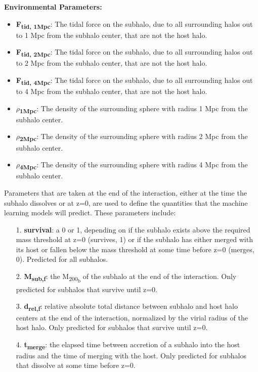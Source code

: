 \documentclass[fleqn,usenatbib]{mnras}
\begin{document}
\vskip 0.1in    
    \noindent\textbf{Environmental Parameters:}
    \begin{itemize}[leftmargin=.4cm,topsep=0pt]
        \item \textbf{F\textsubscript{tid, 1Mpc}}: The tidal force on the subhalo, due to all surrounding halos out to 1 Mpc from the subhalo center, that are not the host halo.
        \item \textbf{F\textsubscript{tid, 2Mpc}}: The tidal force on the subhalo, due to all surrounding halos out to 2 Mpc from the subhalo center, that are not the host halo.
        \item \textbf{F\textsubscript{tid, 4Mpc}}:
        The tidal force on the subhalo, due to all surrounding halos out to 4 Mpc from the subhalo center, that are not the host halo.
        \item \boldmath$\rho$\unboldmath\textbf{\textsubscript{1Mpc}}: The density of the surrounding sphere with radius 1 Mpc from the subhalo center.
        \item \boldmath$\rho$\unboldmath\textbf{\textsubscript{2Mpc}}: The density of the surrounding sphere with radius 2 Mpc from the subhalo center.
        \item \boldmath$\rho$\unboldmath\textbf{\textsubscript{4Mpc}}: The density of the surrounding sphere with radius 4 Mpc from the subhalo center.
    \end{itemize}
\vskip 0.1in  
Parameters that are taken at the end of the interaction, either at the time the subhalo dissolves or at z=0, are used to define the quantities that the machine learning models will predict. These parameters include:
    \begin{enumerate}[leftmargin=.4cm]
        \item [1.] \textbf{survival}: a 0 or 1, depending on if the subhalo exists above the required mass threshold at z=0 (survives, 1) or if the subhalo has either merged with its host or fallen below the mass threshold at some time before z=0 (merges, 0). Predicted for all subhalos.
        \item [2.] \textbf{M\textsubscript{sub,f}}: the M\textsubscript{200\textsubscript{b}} of the subhalo at the end of the interaction. Only predicted for subhalos that survive until z=0.
        \item [3.] \textbf{d\textsubscript{rel,f}}: relative absolute total distance between subhalo and host halo centers at the end of the interaction, normalized by the virial radius of the host halo. Only predicted for subhalos that survive until z=0.
        \item [4.] \textbf{t\textsubscript{merge}}: the elapsed time between accretion of a subhalo into the host radius and the time of merging with the host. Only predicted for subhalos that dissolve at some time before z=0.
    \end{enumerate}
\end{document}
